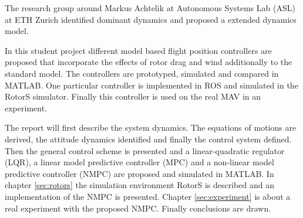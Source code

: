 The research group around Markus Achtelik at Autonomous Systems Lab (ASL) at ETH Zurich identified dominant dynamics and proposed a extended dynamics model. 

In this student project different model based flight position controllers are proposed that incorporate the effects of rotor drag and wind additionally to the standard model. The controllers are prototyped, simulated and compared in MATLAB. One particular controller is implemented in ROS and simulated in the RotorS simulator. Finally this controller is used on the real MAV in an experiment.

The report will first describe the system dynamics. The equations of motions are derived, the attitude dynamics identified and finally the control system defined. Then the general control scheme is presented and a linear-quadratic regulator (LQR), a linear model predictive controller (MPC) and a non-linear model predictive controller (NMPC) are proposed and simulated in MATLAB. In chapter \ref{sec:rotors} the simulation environment RotorS is described and an implementation of the NMPC is presented. Chapter \ref{sec:experiment} is about a real experiment with the proposed NMPC. Finally conclusions are drawn.